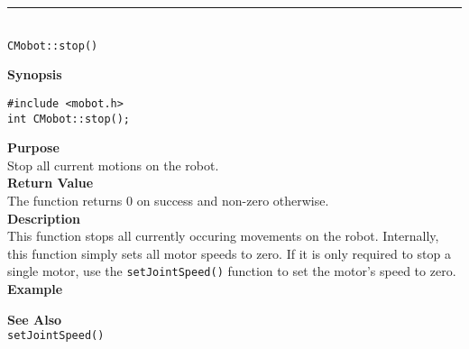 \noindent
\vspace{5pt}
\rule{4.5in}{0.015in}\\
\noindent
{\LARGE \texttt{CMobot::stop()}}\\
{}

\noindent
{\bf Synopsis}
\begin{verbatim}
#include <mobot.h>
int CMobot::stop();
\end{verbatim}

\noindent
{\bf Purpose}\\
Stop all current motions on the robot.\\

\noindent
{\bf Return Value}\\
The function returns 0 on success and non-zero otherwise.\\

\noindent
{\bf Description}\\
This function stops all currently occuring movements on the robot. Internally, this function simply sets all motor speeds to zero. If it is only required to stop a single motor, use the 
\texttt{setJointSpeed()} function to set the motor's speed to zero. \\

\noindent
{\bf Example}\\
\noindent

\noindent
{\bf See Also}\\
\texttt{setJointSpeed()}

